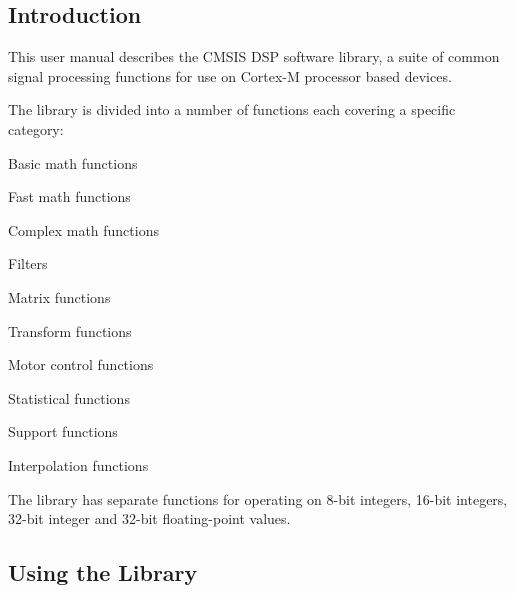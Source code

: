 \subsection*{Introduction }

This user manual describes the C\+M\+S\+IS D\+SP software library, a suite of common signal processing functions for use on Cortex-\/M processor based devices.

The library is divided into a number of functions each covering a specific category\+:
\begin{DoxyItemize}
\item Basic math functions
\item Fast math functions
\item Complex math functions
\item Filters
\item Matrix functions
\item Transform functions
\item Motor control functions
\item Statistical functions
\item Support functions
\item Interpolation functions
\end{DoxyItemize}

The library has separate functions for operating on 8-\/bit integers, 16-\/bit integers, 32-\/bit integer and 32-\/bit floating-\/point values.

\subsection*{Using the Library }

